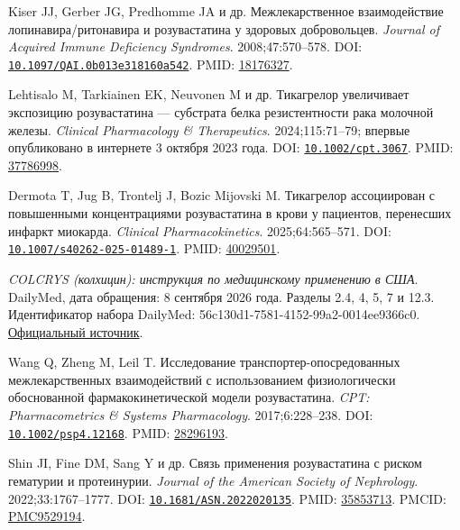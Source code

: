 \documentclass[11pt]{article}
\begin{document}
\begin{description}[before={\microtypesetup{expansion=false}\setlength{\RaggedRightRightskip}{0pt plus 4em}\RaggedRight}]
\item[{[27]}] Kiser JJ, Gerber JG, Predhomme JA и др. Межлекарственное взаимодействие лопинавира/ритонавира и розувастатина у здоровых добровольцев. \textit{\foreignlanguage{english}{Journal of Acquired Immune Deficiency Syndromes}}. 2008;47:570--578. DOI: \href{https://doi.org/10.1097/QAI.0b013e318160a542}{\nolinkurl{10.1097/QAI.0b013e318160a542}}. PMID: \href{https://pubmed.ncbi.nlm.nih.gov/18176327/}{18176327}.
\item[{[28]}] Lehtisalo M, Tarkiainen EK, Neuvonen M и др. Тикагрелор увеличивает экспозицию розувастатина --- субстрата белка резистентности рака молочной железы. \textit{\foreignlanguage{english}{Clinical Pharmacology \& Therapeutics}}. 2024;115:71--79; впервые опубликовано в интернете 3 октября 2023 года. DOI: \href{https://doi.org/10.1002/cpt.3067}{\nolinkurl{10.1002/cpt.3067}}. PMID: \href{https://pubmed.ncbi.nlm.nih.gov/37786998/}{37786998}.
\item[{[29]}] Dermota T, Jug B, Trontelj J, Bozic Mijovski M. Тикагрелор ассоциирован с повышенными концентрациями розувастатина в крови у пациентов, перенесших инфаркт миокарда. \textit{\foreignlanguage{english}{Clinical Pharmacokinetics}}. 2025;64:565--571. DOI: \href{https://doi.org/10.1007/s40262-025-01489-1}{\nolinkurl{10.1007/s40262-025-01489-1}}. PMID: \href{https://pubmed.ncbi.nlm.nih.gov/40029501/}{40029501}.
\item[{[30]}] \textit{COLCRYS (колхицин): инструкция по медицинскому применению в США}. DailyMed, дата обращения: 8 сентября 2026 года. Разделы 2.4, 4, 5, 7 и 12.3. Идентификатор набора DailyMed: 56c130d1-7581-4152-99a2-0014ee9366c0. \href{https://dailymed.nlm.nih.gov/dailymed/drugInfo.cfm?setid=56c130d1-7581-4152-99a2-0014ee9366c0}{Официальный источник}.
\item[{[31]}] Wang Q, Zheng M, Leil T. Исследование транспортер-опосредованных межлекарственных взаимодействий с использованием физиологически обоснованной фармакокинетической модели розувастатина. \textit{\foreignlanguage{english}{CPT: Pharmacometrics \& Systems Pharmacology}}. 2017;6:228--238. DOI: \href{https://doi.org/10.1002/psp4.12168}{\nolinkurl{10.1002/psp4.12168}}. PMID: \href{https://pubmed.ncbi.nlm.nih.gov/28296193/}{28296193}.
\item[{[32]}] Shin JI, Fine DM, Sang Y и др. Связь применения розувастатина с риском гематурии и протеинурии. \textit{\foreignlanguage{english}{Journal of the American Society of Nephrology}}. 2022;33:1767--1777. DOI: \href{https://doi.org/10.1681/ASN.2022020135}{\nolinkurl{10.1681/ASN.2022020135}}. PMID: \href{https://pubmed.ncbi.nlm.nih.gov/35853713/}{35853713}. PMCID: \href{https://pmc.ncbi.nlm.nih.gov/articles/PMC9529194/}{PMC9529194}.

\end{description}
\end{document}
